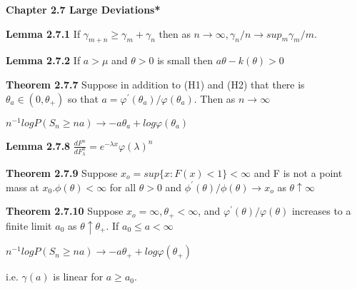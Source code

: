 \documentclass{article}
\begin{document}
\textbf {Chapter 2.7 Large Deviations*}

\textbf {Lemma 2.7.1} If $\gamma_{m+n} \geq \gamma_m + \gamma_n$ then as $n \rightarrow \infty, \gamma_n  / n \rightarrow sup_m \gamma_m / m$.

\textbf {Lemma 2.7.2} If $a > \mu$ and $\theta > 0$ is small then $a\theta - k(\theta) > 0$

\textbf {Theorem 2.7.7} Suppose in addition to (H1) and (H2) that there is $\theta_a \in (0, \theta_+)$ so that $a = \varphi^{'}(\theta_a) / \varphi(\theta_a).$ Then as $n \rightarrow \infty$
\begin{center}
$n^{-1} logP(S_n \geq na) \rightarrow -a\theta_a + log \varphi(\theta_a)$
\end{center}

\textbf {Lemma 2.7.8} $\frac {d F^n}{d F_\lambda^n} = e^{-\lambda x} \varphi(\lambda)^n$

\textbf {Theorem 2.7.9} Suppose $x_o = sup\{ x : F(x) < 1\} < \infty$ and F is not a point mass at $x_0. \phi(\theta) < \infty$ for all $\theta > 0$ and $\phi^{'}(\theta)/\phi(\theta) \rightarrow x_o$ as $\theta \uparrow \infty$

\textbf {Theorem 2.7.10} Suppose $x_o = \infty, \theta_+ < \infty$, and $\varphi^{'}(\theta)/\varphi(\theta)$ increases to a finite limit $a_0$ as $\theta \uparrow \theta_+.$ If $a_0 \leq a < \infty$
\begin{center}
$n^{-1} log P(S_n \geq na) \rightarrow -a\theta_+ + log \varphi(\theta_+)$
\end{center}
i.e. $\gamma(a)$ is linear for $a \geq a_0$.
\end{document}
